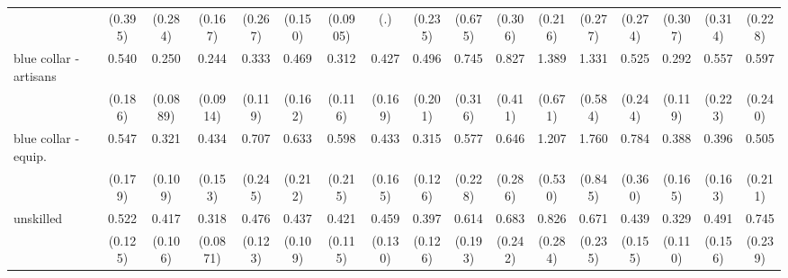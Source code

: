 {\begin{tabular}{l*{16}{c}}
                    &     (0.395)         &     (0.284)         &     (0.167)         &     (0.267)         &     (0.150)         &    (0.0905)         &         (.)         &     (0.235)         &     (0.675)         &     (0.306)         &     (0.216)         &     (0.277)         &     (0.274)         &     (0.307)         &     (0.314)         &     (0.228)         \\
[1em]
blue collar - artisans&       0.540         &       0.250\sym{***}&       0.244\sym{***}&       0.333\sym{**} &       0.469\sym{*}  &       0.312\sym{**} &       0.427\sym{*}  &       0.496         &       0.745         &       0.827         &       1.389         &       1.331         &       0.525         &       0.292\sym{**} &       0.557         &       0.597         \\
                    &     (0.186)         &    (0.0889)         &    (0.0914)         &     (0.119)         &     (0.162)         &     (0.116)         &     (0.169)         &     (0.201)         &     (0.316)         &     (0.411)         &     (0.671)         &     (0.584)         &     (0.244)         &     (0.119)         &     (0.223)         &     (0.240)         \\
[1em]
blue collar - equip.&       0.547         &       0.321\sym{***}&       0.434\sym{*}  &       0.707         &       0.633         &       0.598         &       0.433\sym{*}  &       0.315\sym{**} &       0.577         &       0.646         &       1.207         &       1.760         &       0.784         &       0.388\sym{*}  &       0.396\sym{*}  &       0.505         \\
                    &     (0.179)         &     (0.109)         &     (0.153)         &     (0.245)         &     (0.212)         &     (0.215)         &     (0.165)         &     (0.126)         &     (0.228)         &     (0.286)         &     (0.530)         &     (0.845)         &     (0.360)         &     (0.165)         &     (0.163)         &     (0.211)         \\
[1em]
unskilled           &       0.522\sym{**} &       0.417\sym{***}&       0.318\sym{***}&       0.476\sym{**} &       0.437\sym{***}&       0.421\sym{**} &       0.459\sym{**} &       0.397\sym{**} &       0.614         &       0.683         &       0.826         &       0.671         &       0.439\sym{*}  &       0.329\sym{***}&       0.491\sym{*}  &       0.745         \\
                    &     (0.125)         &     (0.106)         &    (0.0871)         &     (0.123)         &     (0.109)         &     (0.115)         &     (0.130)         &     (0.126)         &     (0.193)         &     (0.242)         &     (0.284)         &     (0.235)         &     (0.155)         &     (0.110)         &     (0.156)         &     (0.239)         \\

\end{tabular}}
